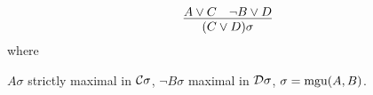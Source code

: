 

\[
	\infer
	[]
	{(C \lor D)\sigma}
	{A \lor C& \lnot B\lor D}
		\]
		where 
		\begin{center}
		$A\sigma$ strictly maximal in ${\mathcal C}\sigma$, $\lnot B\sigma$ maximal in ${\mathcal D}\sigma$, $\sigma=\operatorname{mgu}(A,B)$.
		\end{center}
